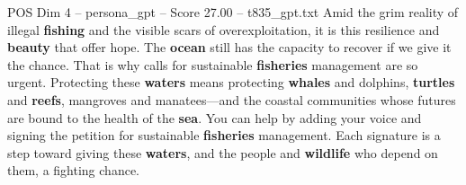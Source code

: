 \begin{textsample}{POS Dim 4 – persona\_gpt – Score 27.00 – t835\_gpt.txt}
Amid the grim reality of illegal \textbf{fishing} and the visible scars of overexploitation, it is this resilience and \textbf{beauty} that offer hope.
The \textbf{ocean} still has the capacity to recover if we give it the chance.
That is why calls for sustainable \textbf{fisheries} management are so urgent.
Protecting these \textbf{waters} means protecting \textbf{whales} and dolphins, \textbf{turtles} and \textbf{reefs}, mangroves and manatees—and the coastal communities whose futures are bound to the health of the \textbf{sea}.
You can help by adding your voice and signing the petition for sustainable \textbf{fisheries} management.
Each signature is a step toward giving these \textbf{waters}, and the people and \textbf{wildlife} who depend on them, a fighting chance.

\end{textsample}
